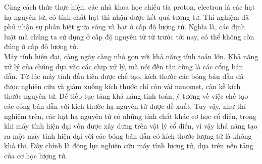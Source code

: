 \indent Cùng cách thức thực hiện, các nhà khoa học chiếu tia proton, electron là các hạt hạ nguyên tử, có tính chất hạt thì nhận được kết quả tương tự. Thí nghiệm đã phủ nhận sự phân biệt giữa sóng và hạt ở cấp độ lượng tử. Nghĩa là, các định luật mà chúng ta sử dụng ở cấp độ nguyên tử từ trước tới nay, có thể không còn đúng ở cấp độ lượng tử.\\
\indent Máy tính hiện đại, càng ngày càng nhỏ gọn với khả năng tính toán lớn. Khả năng xử lý của chúng dựa vào các chip xử lý, mà nói đến tận cùng là các cổng bán dẫn. Từ lúc máy tính đầu tiên được chế tạo, kích thước các bóng bán dẫn đã được nghiên cứu và giảm xuống kích thước chỉ còn vài nanomet, cận kề kích thước nguyên tử. Để tiếp tục tăng khả năng tính toán, ý tưởng về việc chế tạo các cổng bán dẫn với kích thước hạ nguyên tử được đề xuất. Tuy vậy, như thí nghiệm trên, các hạt hạ nguyên tử có những tính chất khác cơ học cổ điển, trong khi máy tính hiện đại vốn được xây dựng trên vật lý cổ điển, vì vậy khả năng tạo ra một máy tính hiện đại với các bóng bán dẫn có kích thước lượng tử là không khả thi. Đây chính là động lực nghiên cứu máy tính lượng tử, dựa trên nền tảng của cơ học lượng tử.

